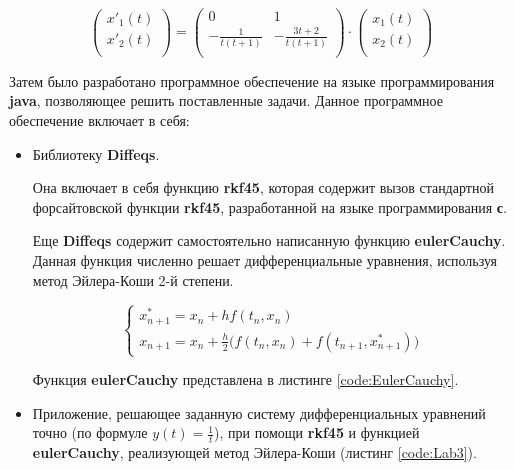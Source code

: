 \begin{displaymath}
\begin{pmatrix}
    x'_1(t) \\
    x'_2(t) \\
\end{pmatrix}
  =
\begin{pmatrix}
    0 & 1 \\
    - \frac{1}{t(t+1)} & -\frac{3t+2}{t(t+1)} \\
\end{pmatrix}
\cdot
\begin{pmatrix}
    x_1(t) \\
    x_2(t) \\
\end{pmatrix}
\end{displaymath}

Затем было разработано программное обеспечение на языке программирования \textbf{java}, позволяющее решить поставленные задачи. Данное программное обеспечение включает в себя:
\begin{itemize}

\item Библиотеку \textbf{Diffeqs}.

 Она включает в себя функцию \textbf{rkf45}, которая содержит вызов стандартной форсайтовской функции \textbf{rkf45}, разработанной на языке программирования \textbf{с}.

 Еще \textbf{Diffeqs} содержит самостоятельно написанную функцию \textbf{eulerCauchy}. Данная функция численно решает дифференциальные уравнения, используя метод Эйлера-Коши 2-й степени.
 
\begin{displaymath}
\begin{cases}
	x_{n+1}^{*} = x_n + hf(t_n, x_n)
	\\
	x_{n+1} = x_n + \frac{h}{2} \Big (f(t_n, x_n) + f(t_{n+1}, x_{n+1}^{*}) \Big) 
\end{cases}
\end{displaymath} 
 
 Функция \textbf{eulerCauchy} представлена в листинге \ref{code:EulerCauchy}.

\item Приложение, решающее заданную систему дифференциальных уравнений точно (по формуле $y(t) = \frac{1}{t}$), при помощи \textbf{rkf45} и функцией \textbf{eulerCauchy}, реализующей метод Эйлера-Коши (листинг \ref{code:Lab3}).

\end{itemize}

